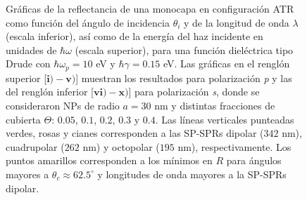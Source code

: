 \begin{figure}[t!]\centering
{}\vspace*{-.5em}
	\caption{Gráficas de la reflectancia de una monocapa en configuración ATR como función del ángulo de incidencia $\theta_i$ y de la longitud de onda $\lambda$ (escala inferior), así como de la energía del haz incidente en unidades de $\hbar\omega$ (escala superior), para una función dieléctrica tipo Drude con $\hbar\omega_p=10$ eV  y  $\hbar\gamma=0. 15$ eV.  Las gráficas   en el renglón superior [$\mathbf{i)-v)}$] muestran los resultados  para  polarización \emph{p} y las del renglón inferior  [$\mathbf{vi)-x)}$] para polarización  \emph{s}, donde se consideraron NPs de radio $a=30$ nm y distintas fracciones de cubierta $\Theta$: $0. 05$, $0. 1$, $0. 2$, $0. 3$ y $0. 4$. Las líneas verticales punteadas verdes, rosas y cianes corresponden a las SP-SPRs dipolar ($342$ nm), cuadrupolar ($262$ nm) y octopolar ($195$ nm), respectivamente.  Los puntos amarillos corresponden a los mínimos en $R$ para ángulos mayores a $\theta_c\approx 62.5^\circ$ y longitudes de onda mayores a la SP-SPRs dipolar. }	\label{fig:R-ATR10}	
	\end{figure}	
	
